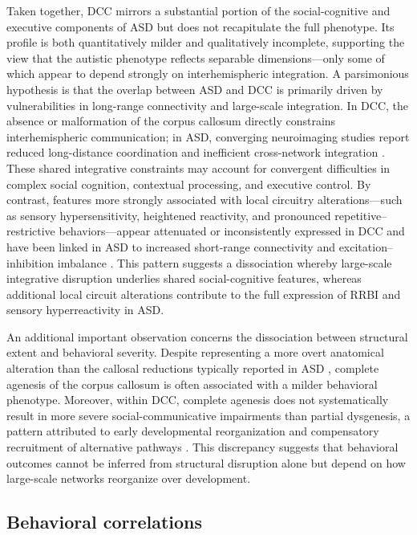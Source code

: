 \documentclass{article}
\begin{document}
Taken together, DCC mirrors a substantial portion of the social-cognitive and executive components of ASD but does not recapitulate the full phenotype. Its profile is both quantitatively milder and qualitatively incomplete, supporting the view that the autistic phenotype reflects separable dimensions—only some of which appear to depend strongly on interhemispheric integration. A parsimonious hypothesis is that the overlap between ASD and DCC is primarily driven by vulnerabilities in long-range connectivity and large-scale integration. In DCC, the absence or malformation of the corpus callosum directly constrains interhemispheric communication; in ASD, converging neuroimaging studies report reduced long-distance coordination and inefficient cross-network integration \citep{Just2007,Belmonte2004}. These shared integrative constraints may account for convergent difficulties in complex social cognition, contextual processing, and executive control. By contrast, features more strongly associated with local circuitry alterations—such as sensory hypersensitivity, heightened reactivity, and pronounced repetitive–restrictive behaviors—appear attenuated or inconsistently expressed in DCC and have been linked in ASD to increased short-range connectivity and excitation–inhibition imbalance \citep{Casanova2002,Hussman2001}. This pattern suggests a dissociation whereby large-scale integrative disruption underlies shared social-cognitive features, whereas additional local circuit alterations contribute to the full expression of RRBI and sensory hyperreactivity in ASD.

An additional important observation concerns the dissociation between structural extent and behavioral severity. Despite representing a more overt anatomical alteration than the callosal reductions typically reported in ASD \citep{Frazier2009,Paul2007}, complete agenesis of the corpus callosum is often associated with a milder behavioral phenotype. Moreover, within DCC, complete agenesis does not systematically result in more severe social-communicative impairments than partial dysgenesis, a pattern attributed to early developmental reorganization and compensatory recruitment of alternative pathways \citep{Tovarmoll2014,Brown2019}. This discrepancy suggests that behavioral outcomes cannot be inferred from structural disruption alone but depend on how large-scale networks reorganize over development.

\subsection{Behavioral correlations}
\end{document}
